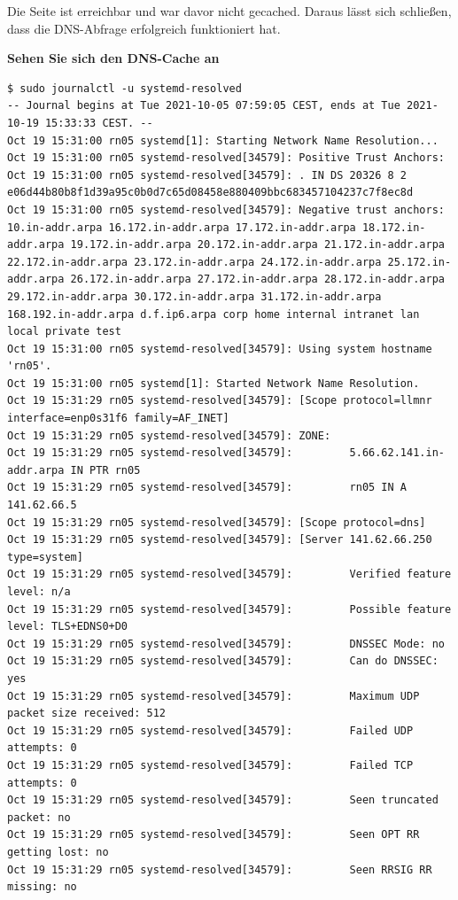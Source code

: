 Die Seite ist erreichbar und war davor nicht gecached. Daraus lässt sich
schließen, dass die DNS-Abfrage erfolgreich funktioniert hat.

\textbf{Sehen Sie sich den DNS-Cache an}

\begin{verbatim}
$ sudo journalctl -u systemd-resolved
-- Journal begins at Tue 2021-10-05 07:59:05 CEST, ends at Tue 2021-10-19 15:33:33 CEST. --
Oct 19 15:31:00 rn05 systemd[1]: Starting Network Name Resolution...
Oct 19 15:31:00 rn05 systemd-resolved[34579]: Positive Trust Anchors:
Oct 19 15:31:00 rn05 systemd-resolved[34579]: . IN DS 20326 8 2 e06d44b80b8f1d39a95c0b0d7c65d08458e880409bbc683457104237c7f8ec8d
Oct 19 15:31:00 rn05 systemd-resolved[34579]: Negative trust anchors: 10.in-addr.arpa 16.172.in-addr.arpa 17.172.in-addr.arpa 18.172.in-addr.arpa 19.172.in-addr.arpa 20.172.in-addr.arpa 21.172.in-addr.arpa 22.172.in-addr.arpa 23.172.in-addr.arpa 24.172.in-addr.arpa 25.172.in-addr.arpa 26.172.in-addr.arpa 27.172.in-addr.arpa 28.172.in-addr.arpa 29.172.in-addr.arpa 30.172.in-addr.arpa 31.172.in-addr.arpa 168.192.in-addr.arpa d.f.ip6.arpa corp home internal intranet lan local private test
Oct 19 15:31:00 rn05 systemd-resolved[34579]: Using system hostname 'rn05'.
Oct 19 15:31:00 rn05 systemd[1]: Started Network Name Resolution.
Oct 19 15:31:29 rn05 systemd-resolved[34579]: [Scope protocol=llmnr interface=enp0s31f6 family=AF_INET]
Oct 19 15:31:29 rn05 systemd-resolved[34579]: ZONE:
Oct 19 15:31:29 rn05 systemd-resolved[34579]:         5.66.62.141.in-addr.arpa IN PTR rn05
Oct 19 15:31:29 rn05 systemd-resolved[34579]:         rn05 IN A 141.62.66.5
Oct 19 15:31:29 rn05 systemd-resolved[34579]: [Scope protocol=dns]
Oct 19 15:31:29 rn05 systemd-resolved[34579]: [Server 141.62.66.250 type=system]
Oct 19 15:31:29 rn05 systemd-resolved[34579]:         Verified feature level: n/a
Oct 19 15:31:29 rn05 systemd-resolved[34579]:         Possible feature level: TLS+EDNS0+D0
Oct 19 15:31:29 rn05 systemd-resolved[34579]:         DNSSEC Mode: no
Oct 19 15:31:29 rn05 systemd-resolved[34579]:         Can do DNSSEC: yes
Oct 19 15:31:29 rn05 systemd-resolved[34579]:         Maximum UDP packet size received: 512
Oct 19 15:31:29 rn05 systemd-resolved[34579]:         Failed UDP attempts: 0
Oct 19 15:31:29 rn05 systemd-resolved[34579]:         Failed TCP attempts: 0
Oct 19 15:31:29 rn05 systemd-resolved[34579]:         Seen truncated packet: no
Oct 19 15:31:29 rn05 systemd-resolved[34579]:         Seen OPT RR getting lost: no
Oct 19 15:31:29 rn05 systemd-resolved[34579]:         Seen RRSIG RR missing: no

\end{verbatim}
